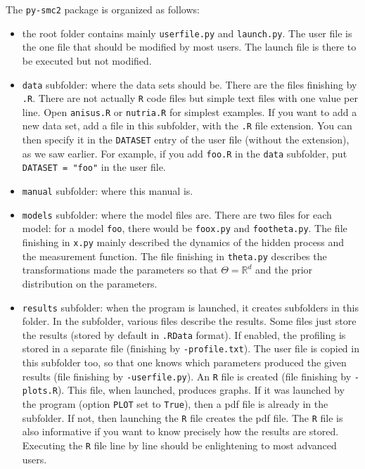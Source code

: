 \documentclass[a4paper,10pt]{paper}
\newcommand{\pysmc}{\texttt{py-smc2}\xspace}
\begin{document}
The \pysmc package is organized as follows:
\begin{itemize}
 \item the root folder contains mainly \texttt{userfile.py} and \texttt{launch.py}. The user file is the one file that should be modified by most users.
The launch file is there to be executed but not modified.
 \item \texttt{data} subfolder: where the data sets should be. There are the files finishing by \texttt{.R}. There are not actually \texttt{R} code files
but simple text files with one value per line. Open \texttt{anisus.R} or \texttt{nutria.R} for simplest examples. If you want to add a new data set,
add a file in this subfolder, with the \texttt{.R} file extension. You can then specify it in the \texttt{DATASET} entry of the user file (without the extension), as we saw earlier. For example, if you add \texttt{foo.R} in the \texttt{data} subfolder, put \texttt{DATASET = "foo"} in the user file.
 \item \texttt{manual} subfolder: where this manual is.
 \item \texttt{models} subfolder: where the model files are. There are two files for each model: for a model \texttt{foo}, there would be \texttt{foox.py} and 
\texttt{footheta.py}. The file finishing in \texttt{x.py} mainly described the dynamics of the hidden process and the measurement function. The file finishing
in \texttt{theta.py} describes the transformations made the parameters so that $\Theta = \mathbb{R}^d$ and the prior distribution on the parameters.
 \item \texttt{results} subfolder: when the program is launched, it creates subfolders in this folder. In the subfolder, various files describe the results.
 Some files just store the results (stored by default in \texttt{.RData} format). If enabled, the profiling is stored in a separate file (finishing by \texttt{-profile.txt}). The user file is copied in this subfolder too, so that one knows which parameters produced the given results (file finishing by \texttt{-userfile.py}). An \texttt{R} file is created (file finishing by \texttt{-plots.R}). This file, when launched, produces graphs. If it was launched by the program
(option \texttt{PLOT} set to \texttt{True}), then a pdf file is already in the subfolder. If not, then launching the \texttt{R} file creates the pdf file.
The \texttt{R} file is also informative if you want to know precisely how the results are stored. Executing the \texttt{R} file line by line should be enlightening to most advanced users.

\end{itemize}
\end{document}
